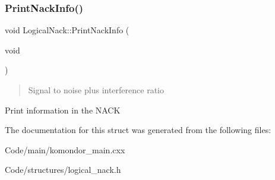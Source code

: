 \subsubsection{\texorpdfstring{Print\+Nack\+Info()}{PrintNackInfo()}}
{\footnotesize\ttfamily void Logical\+Nack\+::\+Print\+Nack\+Info (\begin{DoxyParamCaption}\item[{void}]{ }\end{DoxyParamCaption})\hspace{0.3cm}{\ttfamily [inline]}}



\begin{quote}
Signal to noise plus interference ratio \end{quote}


Print information in the N\+A\+CK 

The documentation for this struct was generated from the following files\+:\begin{DoxyCompactItemize}
\item 
Code/main/komondor\+\_\+main.\+cxx\item 
Code/structures/logical\+\_\+nack.\+h\end{DoxyCompactItemize}
